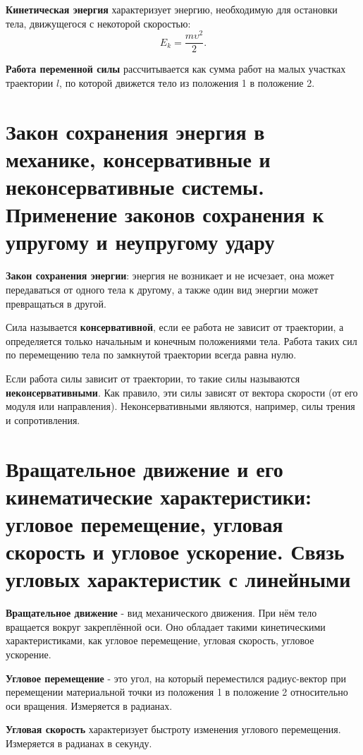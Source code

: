 \documentclass[10pt]{scrbook}
\begin{document}
\textbf{Кинетическая энергия} характеризует энергию, необходимую для остановки тела, движущегося с некоторой скоростью: \[
	E_k = \frac{m \upsilon^2}{2}
	.\]

\textbf{Работа переменной силы} рассчитывается как сумма работ на малых
участках траектории $l$, по которой движется тело из положения 1 в положение 2.

\section[пятый вопрос]{Закон сохранения энергия в механике, консервативные и
  неконсервативные системы. Применение законов сохранения к упругому и
  неупругому удару}

\textbf{Закон сохранения энергии}: энергия не возникает и не исчезает, она
может передаваться от одного тела к другому, а также один вид энергии может
превращаться в другой.

Сила называется \textbf{консервативной}, если ее работа не зависит от
траектории, а определяется только начальным и конечным положениями тела. Работа
таких сил по перемещению тела по замкнутой траектории всегда равна нулю.

Если работа силы зависит от траектории, то такие силы называются
\textbf{неконсервативными}. Как правило, эти силы зависят от вектора скорости
(от его модуля или направления). Неконсервативными являются, например, силы
трения и сопротивления.


\section[шестой вопрос]{Вращательное движение и его кинематические
  характеристики: угловое перемещение, угловая скорость и угловое ускорение.
  Связь угловых характеристик с линейными}

\textbf{Вращательное движение} - вид механического движения. При нём тело
вращается вокруг закреплённой оси. Оно обладает такими кинетическими
характеристиками, как угловое перемещение, угловая скорость, угловое ускорение.

\textbf{Угловое перемещение} - это угол, на который переместился радиус-вектор
при перемещении материальной точки из положения 1 в положение 2 относительно
оси вращения. Измеряется в радианах.

\textbf{Угловая скорость} характеризует быстроту изменения углового перемещения.
Измеряется в радианах в секунду.
\end{document}
